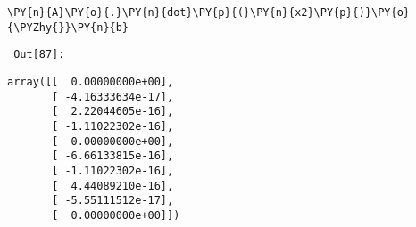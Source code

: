 {\par%
\vspace{-1\baselineskip}%
}%
\begin{notebookcell}[87]%
\begin{addmargin}[\cellleftmargin]{0em}%
{\smaller%
\par%
%
\vspace{-1\smallerfontscale}%
\begin{Verbatim}[commandchars=\\\{\}]
\PY{n}{A}\PY{o}{.}\PY{n}{dot}\PY{p}{(}\PY{n}{x2}\PY{p}{)}\PY{o}{\PYZhy{}}\PY{n}{b}
\end{Verbatim}
%
\par%
\vspace{-1\smallerfontscale}}%
\end{addmargin}
\end{notebookcell}

\par\vspace{1\smallerfontscale}%
    
        {\par%
        \vspace{-1\smallerfontscale}%
        \noindent%
        \begin{minipage}{\cellleftmargin}%
    \hfill%
    {\smaller%
    \tt%
    \color{nbframe-out-prompt}%
    Out[87]:}%
    \hspace{\inputpadding}%
    \hspace{0em}%
    \hspace{3pt}%
    \end{minipage}%
        }%
    \begin{addmargin}[\cellleftmargin]{0em}%
    {\smaller%
    \vspace{-1\smallerfontscale}%
    
    
    
    \begin{verbatim}
array([[  0.00000000e+00],
       [ -4.16333634e-17],
       [  2.22044605e-16],
       [ -1.11022302e-16],
       [  0.00000000e+00],
       [ -6.66133815e-16],
       [ -1.11022302e-16],
       [  4.44089210e-16],
       [ -5.55111512e-17],
       [  0.00000000e+00]])
    \end{verbatim}

    
}%
    \end{addmargin}%

